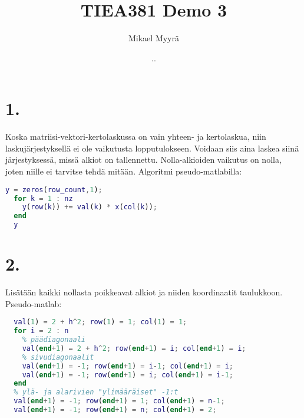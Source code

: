 \documentclass{article}
\title{TIEA381 Demo 3}
\author{Mikael Myyrä}
\date{\number\day.\number\month.\number\year}
\begin{document}
\maketitle

\section*{1.}

Koska matriisi-vektori-kertolaskussa on vain yhteen- ja kertolaskua,
niin laskujärjestyksellä ei ole vaikutusta lopputulokseen. Voidaan siis aina
laskea siinä järjestyksessä, missä alkiot on tallennettu.
Nolla-alkioiden vaikutus on nolla, joten niille ei tarvitse tehdä mitään.
Algoritmi pseudo-matlabilla:
\begin{lstlisting}[language=Matlab]
  y = zeros(row_count,1);
  for k = 1 : nz
    y(row(k)) += val(k) * x(col(k));
  end
  y
\end{lstlisting}


\section*{2.}

Lisätään kaikki nollasta poikkeavat alkiot ja niiden koordinaatit taulukkoon.
Pseudo-matlab:
\begin{lstlisting}[language=Matlab]
  % vasen yläkulma erikseen, jotta voidaan käyttää `i-1` silmukassa
  val(1) = 2 + h^2; row(1) = 1; col(1) = 1;
  for i = 2 : n
    % päädiagonaali
    val(end+1) = 2 + h^2; row(end+1) = i; col(end+1) = i;
    % sivudiagonaalit
    val(end+1) = -1; row(end+1) = i-1; col(end+1) = i;
    val(end+1) = -1; row(end+1) = i; col(end+1) = i-1;
  end
  % ylä- ja alarivien "ylimääräiset" -1:t
  val(end+1) = -1; row(end+1) = 1; col(end+1) = n-1;
  val(end+1) = -1; row(end+1) = n; col(end+1) = 2;
\end{lstlisting}
\end{document}
